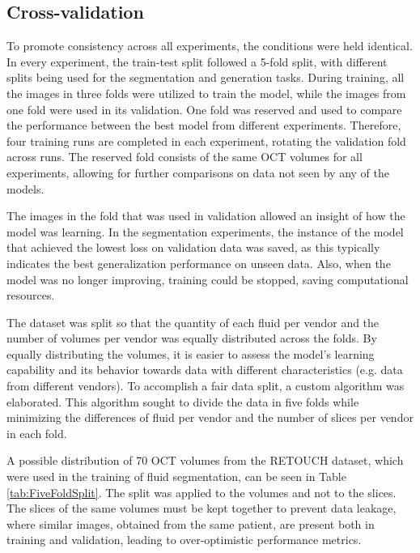 \subsection{Cross-validation}\label{CrossValidation}
To promote consistency across all experiments, the conditions were held identical. In every experiment, the train-test split followed a 5-fold split, with different splits being used for the segmentation and generation tasks. During training, all the images in three folds were utilized to train the model, while the images from one fold were used in its validation. One fold was reserved and used to compare the performance between the best model from different experiments. Therefore, four training runs are completed in each experiment, rotating the validation fold across runs. The reserved fold consists of the same OCT volumes for all experiments, allowing for further comparisons on data not seen by any of the models.
\par
The images in the fold that was used in validation allowed an insight of how the model was learning. In the segmentation experiments, the instance of the model that achieved the lowest loss on validation data was saved, as this typically indicates the best generalization performance on unseen data. Also, when the model was no longer improving, training could be stopped, saving computational resources.
\par
The dataset was split so that the quantity of each fluid per vendor and the number of volumes per vendor was equally distributed across the folds. By equally distributing the volumes, it is easier to assess the model's learning capability and its behavior towards data with different characteristics (e.g. data from different vendors). To accomplish a fair data split, a custom algorithm was elaborated. This algorithm sought to divide the data in five folds while minimizing the differences of fluid per vendor and the number of slices per vendor in each fold.
\par
A possible distribution of 70 OCT volumes from the RETOUCH dataset, which were used in the training of fluid segmentation, can be seen in Table \ref{tab:FiveFoldSplit}. The split was applied to the volumes and not to the slices. The slices of the same volumes must be kept together to prevent data leakage, where similar images, obtained from the same patient, are present both in training and validation, leading to over-optimistic performance metrics.

